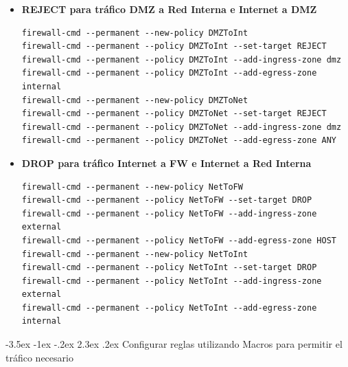 \documentclass[11pt]{report}
\makeatletter
\renewcommand\chapter{\@startsection{chapter}{0}{\z@}%
    {-3.5ex \@plus -1ex \@minus -.2ex}%
    {2.3ex \@plus.2ex}%
    {\normalfont\Large\bfseries}}
\makeatother
\begin{document}
\begin{itemize}
  \item \textbf{REJECT para tráfico DMZ a Red Interna e Internet a DMZ}
  \begin{verbatim}
firewall-cmd --permanent --new-policy DMZToInt
firewall-cmd --permanent --policy DMZToInt --set-target REJECT
firewall-cmd --permanent --policy DMZToInt --add-ingress-zone dmz
firewall-cmd --permanent --policy DMZToInt --add-egress-zone internal
firewall-cmd --permanent --new-policy DMZToNet
firewall-cmd --permanent --policy DMZToNet --set-target REJECT
firewall-cmd --permanent --policy DMZToNet --add-ingress-zone dmz
firewall-cmd --permanent --policy DMZToNet --add-egress-zone ANY
  \end{verbatim}

  \item \textbf{DROP para tráfico Internet a FW e Internet a Red Interna}
  \begin{verbatim}
firewall-cmd --permanent --new-policy NetToFW
firewall-cmd --permanent --policy NetToFW --set-target DROP
firewall-cmd --permanent --policy NetToFW --add-ingress-zone external
firewall-cmd --permanent --policy NetToFW --add-egress-zone HOST
firewall-cmd --permanent --new-policy NetToInt
firewall-cmd --permanent --policy NetToInt --set-target DROP
firewall-cmd --permanent --policy NetToInt --add-ingress-zone external
firewall-cmd --permanent --policy NetToInt --add-egress-zone internal
  \end{verbatim}
\end{itemize}

\cleardoublepage

\chapter{Configurar reglas utilizando Macros para permitir el tráfico necesario}

\cleardoublepage
\end{document}

